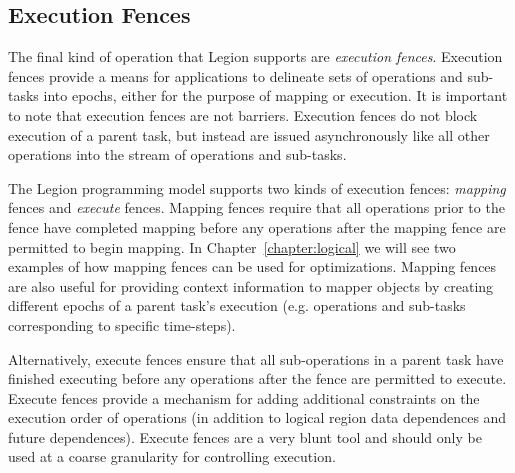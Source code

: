 \subsection{Execution Fences}
\label{subsec:fences}
The final kind of operation that Legion supports
are {\em execution fences}. Execution fences
provide a means for applications to delineate
sets of operations and sub-tasks into epochs,
either for the purpose of mapping or execution.
It is important to note that execution fences
are not barriers. Execution fences do not block
execution of a parent task, but instead are
issued asynchronously like all other operations
into the stream of operations and sub-tasks.

The Legion programming model supports two kinds
of execution fences: {\em mapping} fences and
{\em execute} fences. Mapping fences require
that all operations prior to the fence have 
completed mapping before any operations after
the mapping fence are permitted to begin mapping.
In Chapter~\ref{chapter:logical} we will see
two examples of how mapping fences can be 
used for optimizations. Mapping fences are
also useful for providing context information to mapper 
objects by creating different epochs of a parent 
task's execution (e.g. operations and sub-tasks
corresponding to specific time-steps).

Alternatively, execute fences ensure that all
sub-operations in a parent task have finished
executing before any operations after the fence
are permitted to execute. Execute fences provide
a mechanism for adding additional constraints
on the execution order of operations (in addition
to logical region data dependences and future
dependences). Execute fences are a very blunt
tool and should only be used at a coarse
granularity for controlling execution.


